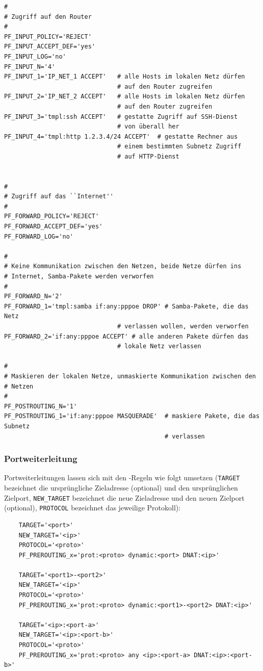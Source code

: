 \begin{example}
\begin{verbatim}
#
# Zugriff auf den Router
#
PF_INPUT_POLICY='REJECT'
PF_INPUT_ACCEPT_DEF='yes'
PF_INPUT_LOG='no'
PF_INPUT_N='4'
PF_INPUT_1='IP_NET_1 ACCEPT'   # alle Hosts im lokalen Netz dürfen
                               # auf den Router zugreifen
PF_INPUT_2='IP_NET_2 ACCEPT'   # alle Hosts im lokalen Netz dürfen
                               # auf den Router zugreifen
PF_INPUT_3='tmpl:ssh ACCEPT'   # gestatte Zugriff auf SSH-Dienst
                               # von überall her
PF_INPUT_4='tmpl:http 1.2.3.4/24 ACCEPT'  # gestatte Rechner aus
                               # einem bestimmten Subnetz Zugriff
                               # auf HTTP-Dienst


#
# Zugriff auf das ``Internet''
#
PF_FORWARD_POLICY='REJECT'
PF_FORWARD_ACCEPT_DEF='yes'
PF_FORWARD_LOG='no'

#
# Keine Kommunikation zwischen den Netzen, beide Netze dürfen ins
# Internet, Samba-Pakete werden verworfen
#
PF_FORWARD_N='2'
PF_FORWARD_1='tmpl:samba if:any:pppoe DROP' # Samba-Pakete, die das Netz
                               # verlassen wollen, werden verworfen
PF_FORWARD_2='if:any:pppoe ACCEPT' # alle anderen Pakete dürfen das
                               # lokale Netz verlassen

#
# Maskieren der lokalen Netze, unmaskierte Kommunikation zwischen den
# Netzen
#
PF_POSTROUTING_N='1'
PF_POSTROUTING_1='if:any:pppoe MASQUERADE'  # maskiere Pakete, die das Subnetz
                                            # verlassen
\end{verbatim}
\end{example}

\subsubsection{Portweiterleitung}

Portweiterleitungen lassen sich mit den -Regeln wie folgt
umsetzen (\verb+TARGET+ bezeichnet die ursprüngliche Zieladresse (optional) und
den ursprünglichen Zielport, \verb+NEW_TARGET+ bezeichnet die neue Zieladresse
und den neuen Zielport (optional), \verb+PROTOCOL+ bezeichnet das jeweilige
Protokoll):

\begin{example}
\begin{verbatim}
    TARGET='<port>'
    NEW_TARGET='<ip>'
    PROTOCOL='<proto>'
    PF_PREROUTING_x='prot:<proto> dynamic:<port> DNAT:<ip>'

    TARGET='<port1>-<port2>'
    NEW_TARGET='<ip>'
    PROTOCOL='<proto>'
    PF_PREROUTING_x='prot:<proto> dynamic:<port1>-<port2> DNAT:<ip>'

    TARGET='<ip>:<port-a>'
    NEW_TARGET='<ip>:<port-b>'
    PROTOCOL='<proto>'
    PF_PREROUTING_x='prot:<proto> any <ip>:<port-a> DNAT:<ip>:<port-b>'
\end{verbatim}
\end{example}

